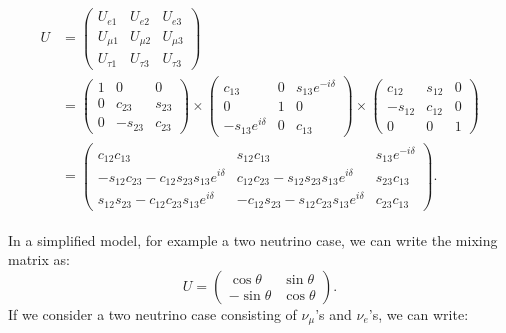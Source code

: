 \documentclass[aps,prd,twocolumn,nofootinbib]{revtex4-1}
\begin{document}
\begin{widetext}
  \begin{align}
    \begin{split}
      U & =
      \begin{pmatrix}
        U_{e1}    & U_{e2}    & U_{e3}   \\
        U_{\mu1}  & U_{\mu2}  & U_{\mu3} \\
        U_{\tau1} & U_{\tau3} & U_{\tau3}
      \end{pmatrix} \\
      \label{eq:umatrix}
      & = \begin{pmatrix}
        1 & 0 & 0 \\
        0 & c_{23} & s_{23} \\
        0 & -s_{23} & c_{23} \end{pmatrix} \times
      \begin{pmatrix}
        c_{13} & 0 & s_{13}e^{-i\delta} \\
        0      & 1 & 0 \\
        -s_{13}e^{i\delta} & 0 & c_{13} \end{pmatrix} \times
      \begin{pmatrix}
        c_{12} & s_{12} & 0 \\
        -s_{12} & c_{12} & 0 \\
        0 & 0 & 1
      \end{pmatrix} \\
      & = \begin{pmatrix}
        c_{12}c_{13} & s_{12}c_{13} & s_{13}e^{-i\delta} \\
        -s_{12}c_{23} - c_{12}s_{23}s_{13}e^{i\delta} & c_{12}c_{23} - s_{12}s_{23}s_{13}e^{i\delta} & s_{23}c_{13} \\
        s_{12}s_{23} - c_{12}c_{23}s_{13}e^{i\delta} & -c_{12}s_{23} - s_{12}c_{23}s_{13}e^{i\delta} & c_{23}c_{13}
      \end{pmatrix}.
    \end{split}
  \end{align}
\end{widetext}
In a simplified model, for example a two neutrino case, we can write the mixing matrix as:
\begin{equation}
  U = \begin{pmatrix}
    \cos\theta & \sin\theta \\
    -\sin\theta & \cos\theta
  \end{pmatrix}.
\end{equation}
If we consider a two neutrino case consisting of $\nu_{\mu}$'s and $\nu_e$'s, we can write:
\end{document}
